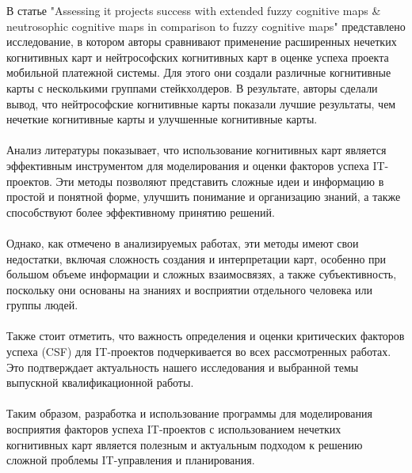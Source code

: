 \documentclass{article}
\begin{document}
    В статье "{}Assessing it projects success with extended fuzzy cognitive maps \& neutrosophic cognitive maps in comparison to fuzzy cognitive maps"{} \cite{litlink20} представлено исследование, в котором авторы сравнивают применение расширенных нечетких когнитивных карт и нейтрософских когнитивных карт в оценке успеха проекта мобильной платежной системы. Для этого они создали различные когнитивные карты с несколькими группами стейкхолдеров. В результате, авторы сделали вывод, что нейтрософские когнитивные карты показали лучшие результаты, чем нечеткие когнитивные карты и улучшенные когнитивные карты.\\
    ~\\
    Анализ литературы показывает, что использование когнитивных карт является эффективным инструментом для моделирования и оценки факторов успеха IT-проектов. Эти методы позволяют представить сложные идеи и информацию в простой и понятной форме, улучшить понимание и организацию знаний, а также способствуют более эффективному принятию решений.\\
    ~\\
    Однако, как отмечено в анализируемых работах, эти методы имеют свои недостатки, включая сложность создания и интерпретации карт, особенно при большом объеме информации и сложных взаимосвязях, а также субъективность, поскольку они основаны на знаниях и восприятии отдельного человека или группы людей.\\
    ~\\
    Также стоит отметить, что важность определения и оценки критических факторов успеха (CSF) для IT-проектов подчеркивается во всех рассмотренных работах. Это подтверждает актуальность нашего исследования и выбранной темы выпускной квалификационной работы.\\
    ~\\
    Таким образом, разработка и использование программы для моделирования восприятия факторов успеха IT-проектов с использованием нечетких когнитивных карт является полезным и актуальным подходом к решению сложной проблемы IT-управления и планирования.\\
\end{document}
